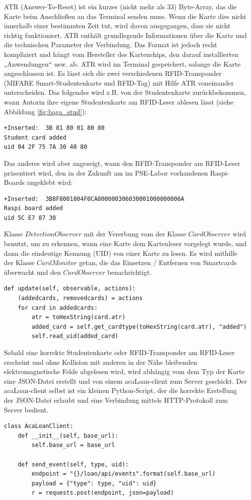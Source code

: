 ATR (Answer-To-Reset) ist ein kurzes (nicht mehr als 33) Byte-Array, das die Karte beim Anschließen an das Terminal senden muss. Wenn die Karte dies nicht innerhalb einer bestimmten Zeit tut, wird davon ausgegangen, dass sie nicht richtig funktioniert. ATR enthält grundlegende Informationen über die Karte und die technischen Parameter der Verbindung. Das Format ist jedoch recht kompliziert und hängt vom Hersteller des Kartenchips, den darauf installierten „Anwendungen“ usw. ab. ATR wird im Terminal gespeichert, solange die Karte angeschlossen ist. Es lässt sich die zwei verschiedenen RFID-Transponder (MIFARE Smart-Studentenkarte und RFID-Tag) mit Hilfe ATR voneinander unterscheiden. Das folgendes wird z.B. von der Studentenkarte zurückbekommen, wann Autorin ihre eigene Studentenkarte am RFID-Leser ablesen lässt (siehe Abbildung \ref{fig:baga_stud}):
\begin{lstlisting}
+Inserted:  3B 81 80 01 80 80
Student card added
uid 04 2F 75 7A 30 40 80
\end{lstlisting}

Das anderes wird aber angezeigt, wann den RFID-Transponder am RFID-Leser präsentiert wird, den in der Zukunft am im PSE-Labor vorhandenen Raspi-Boards angeklebt wird:
\begin{lstlisting}
+Inserted:  3B8F8001804F0CA000000306030001000000006A
Raspi board added
uid 5C E7 87 30
\end{lstlisting}

Klasse $DetectionObserver$ mit der Vererbung vom der Klasse $CardObserver$ wird benutzt, um zu erkennen, wann eine Karte dem Kartenleser vorgelegt wurde, und dann die eindeutige Kennung (UID) von einer Karte zu lesen. Es wird mithilfe der Klasse $ CardMonitor$ getan, die das Einsetzen / Entfernen von Smartcards überwacht und den $CardObserver$ benachrichtigt. 
\begin{lstlisting}
def update(self, observable, actions):
	(addedcards, removedcards) = actions
	for card in addedcards:
		atr = toHexString(card.atr)
		added_card = self.get_cardtype(toHexString(card.atr), "added")
		self.read_uid(added_card)
\end{lstlisting}

Sobald eine korrekte Studentenkarte oder RFID-Transponder am RFID-Leser erscheint und ohne Kollision mit anderen in der Nähe bleibenden elektromagnetische Felde abgelesen wird, wird abhängig vom dem Typ der Karte eine JSON-Datei erstellt und von einem acaLoan-client zum Server geschickt. Der acaLoan-client selbst ist ein kleinen Python-Script, der die korrekte Erstellung der JSON-Datei erlaubt und eine Verbindung mittels HTTP-Protokoll zum Server bedient. 
\begin{lstlisting}
class AcaLoanClient:
	def __init__(self, base_url):
		self.base_url = base_url
	
	def send_event(self, type, uid):
		endpoint = "{}/loan/api/events".format(self.base_url)
		payload = {"type": type, "uid": uid}
		r = requests.post(endpoint, json=payload)
\end{lstlisting}

